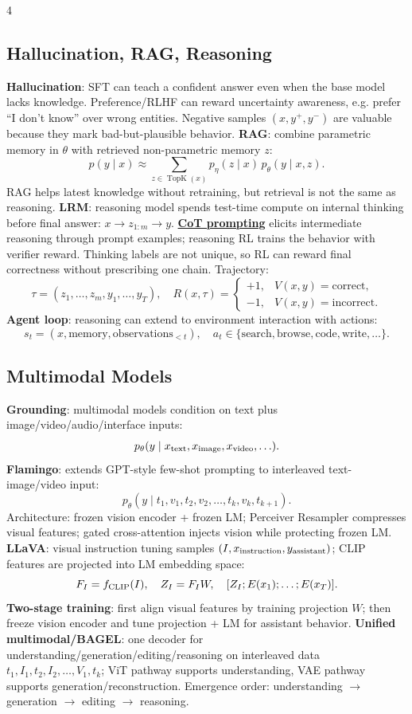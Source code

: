 \documentclass{article}
\newcommand{\key}[1]{\textbf{#1}}
\newcommand{\lowterm}[1]{\textbf{\underline{#1}}}
\newcommand{\1}{\mathbf 1}
\begin{document}
\begin{multicols*}{4}
\subsection{Hallucination, RAG, Reasoning}
\key{Hallucination}: SFT can teach a confident answer even when the base model lacks knowledge. Preference/RLHF can reward uncertainty awareness, e.g. prefer ``I don't know'' over wrong entities. Negative samples $(x,y^+,y^-)$ are valuable because they mark bad-but-plausible behavior.
\key{RAG}: combine parametric memory in $\theta$ with retrieved non-parametric memory $z$:
\[
p(y\mid x)\approx\sum_{z\in\operatorname{TopK}(x)}
p_\eta(z\mid x)\,p_\theta(y\mid x,z).
\]
RAG helps latest knowledge without retraining, but retrieval is not the same as reasoning. \key{LRM}: reasoning model spends test-time compute on internal thinking before final answer:
\(
x\rightarrow z_{1:m}\rightarrow y.
\)
\lowterm{CoT prompting} elicits intermediate reasoning through prompt examples; reasoning RL trains the behavior with verifier reward. Thinking labels are not unique, so RL can reward final correctness without prescribing one chain. Trajectory:
\[
\tau=(z_1,\ldots,z_m,y_1,\ldots,y_T),\quad
R(x,\tau)=
\begin{cases}
+1,&V(x,y)=\text{correct},\\
-1,&V(x,y)=\text{incorrect}.
\end{cases}
\]
\key{Agent loop}: reasoning can extend to environment interaction with actions:
\[
s_t=(x,\text{memory},\text{observations}_{<t}),\quad
a_t\in\{\text{search},\text{browse},\text{code},\text{write},\ldots\}.
\]

\subsection{Multimodal Models}
\key{Grounding}: multimodal models condition on text plus image/video/audio/interface inputs:
\[
p_\theta(y\mid x_{\rm text},x_{\rm image},x_{\rm video},\ldots).
\]
\key{Flamingo}: extends GPT-style few-shot prompting to interleaved text-image/video input:
\[
p_\theta(y\mid t_1,v_1,t_2,v_2,\ldots,t_k,v_k,t_{k+1}).
\]
Architecture: frozen vision encoder + frozen LM; Perceiver Resampler compresses visual features; gated cross-attention injects vision while protecting frozen LM. \key{LLaVA}: visual instruction tuning samples $(I,x_{\rm instruction},y_{\rm assistant})$; CLIP features are projected into LM embedding space:
\[
F_I=f_{\rm CLIP}(I),\quad Z_I=F_IW,\quad [Z_I;E(x_1);\ldots;E(x_T)].
\]
\key{Two-stage training}: first align visual features by training projection $W$; then freeze vision encoder and tune projection + LM for assistant behavior. \key{Unified multimodal/BAGEL}: one decoder for understanding/generation/editing/reasoning on interleaved data $t_1,I_1,t_2,I_2,\ldots,V_1,t_k$; ViT pathway supports understanding, VAE pathway supports generation/reconstruction. Emergence order: understanding $\to$ generation $\to$ editing $\to$ reasoning.


\end{multicols*}
\end{document}
